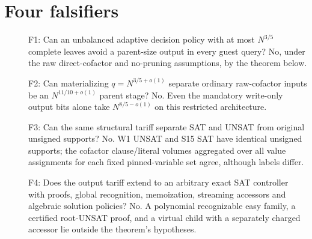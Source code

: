 \documentclass[11pt]{article}
\begin{document}
\section*{Four falsifiers}
\begin{description}
\item[] F1: Can an unbalanced adaptive decision policy with at most $N^{3/5}$ complete leaves avoid a parent-size output in every guest query? No, under the raw direct-cofactor and no-pruning assumptions, by the theorem below.
\item[] F2: Can materializing $q=N^{3/5+o(1)}$ separate ordinary raw-cofactor inputs be an $N^{11/10+o(1)}$ parent stage? No. Even the mandatory write-only output bits alone take $N^{8/5-o(1)}$ on this restricted architecture.
\item[] F3: Can the same structural tariff separate SAT and UNSAT from original unsigned supports? No. W1 UNSAT and S15 SAT have identical unsigned supports; the cofactor clause/literal volumes aggregated over all value assignments for each fixed pinned-variable set agree, although labels differ.
\item[] F4: Does the output tariff extend to an arbitrary exact SAT controller with proofs, global recognition, memoization, streaming accessors and algebraic solution policies? No. A polynomial recognizable easy family, a certified root-UNSAT proof, and a virtual child with a separately charged accessor lie outside the theorem's hypotheses.
\end{description}
\end{document}
